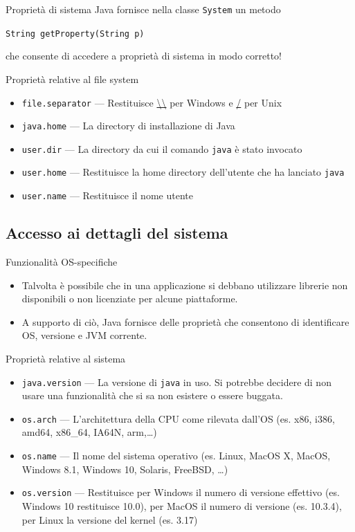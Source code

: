 \documentclass[presentation]{beamer}
\begin{document}
\begin{frame}{Proprietà di sistema}
	Java fornisce nella classe \texttt{System} un metodo\\
	\begin{center}
	{\Large \texttt{String getProperty(String p)}}
	\end{center}
	che consente di accedere a proprietà di sistema in modo corretto!
	\vspace{10pt}
	\begin{block}{Proprietà relative al file system}
		\begin{itemize}
			\item \texttt{file.separator} --- Restituisce \url{\\} per Windows e \url{/} per Unix
			\item \texttt{java.home} --- La directory di installazione di Java
			\item \texttt{user.dir} --- La directory da cui il comando \texttt{java} è stato invocato
			\item \texttt{user.home} --- Restituisce la home directory dell'utente che ha lanciato \texttt{java}
			\item \texttt{user.name} --- Restituisce il nome utente
		\end{itemize}
	\end{block}
\end{frame}

\subsection{Accesso ai dettagli del sistema}

\begin{frame}{Funzionalità OS-specifiche}
	\begin{itemize}
	\item Talvolta è possibile che in una applicazione si debbano utilizzare librerie non disponibili o non licenziate per alcune piattaforme.
	\item A supporto di ciò, Java fornisce delle proprietà che consentono di identificare OS, versione e JVM corrente.
	\end{itemize}
	\begin{block}{Proprietà relative al sistema}
	\begin{itemize}
	\item \texttt{java.version} --- La versione di \texttt{java} in uso. Si potrebbe decidere di non usare una funzionalità che si sa non esistere o essere buggata.
	\item \texttt{os.arch} --- L'architettura della CPU come rilevata dall'OS (es. x86, i386, amd64, x86\_64, IA64N, arm,\dots)
	\item \texttt{os.name} --- Il nome del sistema operativo (es. Linux, MacOS X, MacOS, Windows 8.1, Windows 10, Solaris, FreeBSD, \dots)
	\item \texttt{os.version} --- Restituisce per Windows il numero di versione effettivo (es. Windows 10 restituisce 10.0), per MacOS il numero di versione (es. 10.3.4), per Linux la versione del kernel (es. 3.17)
	\end{itemize}
	\end{block}
\end{frame}
\end{document}
